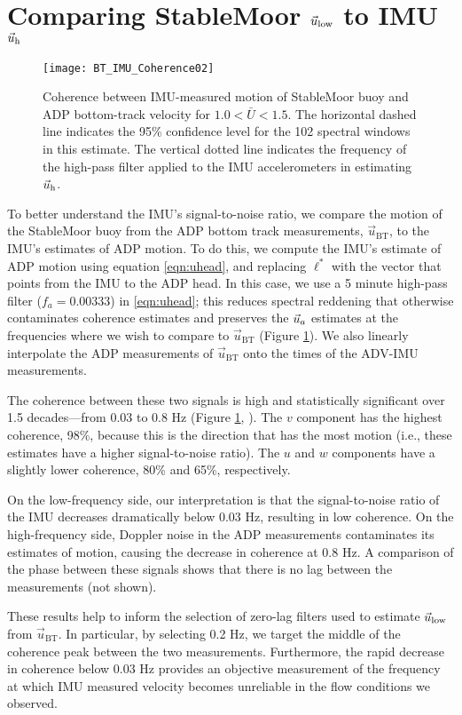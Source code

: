 \section{Comparing StableMoor $\vec{u}_\mathrm{low}$ to IMU $\vec{u}_\mathrm{h}$}
\label{apdx:ulow}

\def\ubt{\ensuremath{\vec{u}_\mathrm{BT}}}

\begin{figure}[t]
  \centering
  \texttt{[image: BT\_IMU\_Coherence02]}
  \caption{Coherence between IMU-measured motion of StableMoor buoy and ADP bottom-track velocity for $1.0<\bar{U}<1.5$. The horizontal dashed line indicates the 95\% confidence level for the 102 spectral windows in this estimate. The vertical dotted line indicates the frequency of the high-pass filter applied to the IMU accelerometers in estimating $\vec{u}_\mathrm{h}$.}
  \label{fig:SM_coh}
\end{figure}

To better understand the IMU's signal-to-noise ratio, we compare the motion of the StableMoor buoy from the ADP bottom track measurements, $\ubt$, to the IMU's estimates of ADP motion. To do this, we compute the IMU's estimate of ADP motion using equation \eqref{eqn:uhead}, and replacing $\ell^{*}$ with the vector that points from the IMU to the ADP head. In this case, we use a 5 minute high-pass filter ($f_a=0.00333$) in \eqref{eqn:uhead}; this reduces spectral reddening that otherwise contaminates coherence estimates and preserves the $\vec{u}_a$ estimates at the frequencies where we wish to compare to $\ubt$ (Figure \ref{fig:SM_coh}).  We also linearly interpolate the ADP measurements of $\ubt$ onto the times of the ADV-IMU measurements.

The coherence between these two signals is high and statistically significant over 1.5 decades---from 0.03 to 0.8 Hz (Figure \ref{fig:SM_coh}, \citealt[][]{Priestley1981}). The $v$ component has the highest coherence, 98\%, because this is the direction that has the most motion (i.e., these estimates have a higher signal-to-noise ratio).  The $u$ and $w$ components have a slightly lower coherence, 80\% and 65\%, respectively.

On the low-frequency side, our interpretation is that the signal-to-noise ratio of the IMU decreases dramatically below 0.03 Hz, resulting in low coherence. On the high-frequency side, Doppler noise in the ADP measurements contaminates its estimates of motion, causing the decrease in coherence at 0.8 Hz. A comparison of the phase between these signals shows that there is no lag between the measurements (not shown).

These results help to inform the selection of zero-lag filters used to estimate $\vec{u}_\mathrm{low}$ from $\ubt$. In particular, by selecting 0.2 Hz, we target the middle of the coherence peak between the two measurements. Furthermore, the rapid decrease in coherence below 0.03 Hz provides an objective measurement of the frequency at which IMU measured velocity becomes unreliable in the flow conditions we observed. 



